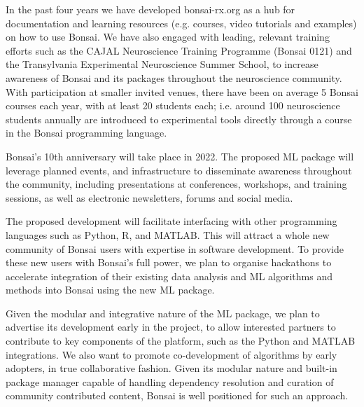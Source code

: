 In the past four years we have developed bonsai-rx.org as a hub for documentation and learning
resources (e.g. courses, video tutorials and examples) on how to use Bonsai. We have also engaged
with leading, relevant training efforts such as the CAJAL Neuroscience
Training Programme (Bonsai 0121) and the Transylvania Experimental Neuroscience
Summer School, to increase awareness of Bonsai and
its packages throughout the neuroscience community. With participation
at smaller invited venues, there have been on average 5 Bonsai courses
each year, with at least 20 students each; i.e.  around 100 neuroscience students annually are introduced to experimental tools directly through a
course in the Bonsai programming language.

Bonsai's 10th anniversary will take place in 2022. The proposed ML package will leverage planned events, and infrastructure to disseminate
awareness throughout the community, including presentations at conferences,
workshops, and training sessions, as well as electronic newsletters, forums and
social media.

The proposed development will facilitate interfacing with other programming languages
such as Python, R, and MATLAB. This will attract a whole new
community of Bonsai users with expertise in software development. To provide these new users with Bonsai's full power,
we plan to organise hackathons to accelerate integration of their existing data
analysis and ML algorithms and methods into Bonsai using the new
ML package.

 Given the modular and integrative nature of the ML package, we
 plan to advertise its development early in the project, to allow interested
 partners to contribute to key
 components of the platform, such as the Python and MATLAB integrations. We
 also want to promote co-development of algorithms by early adopters, in true collaborative fashion. Given its modular nature and built-in
 package manager capable of handling dependency resolution and curation of
 community contributed content, Bonsai is well positioned for such an approach.
